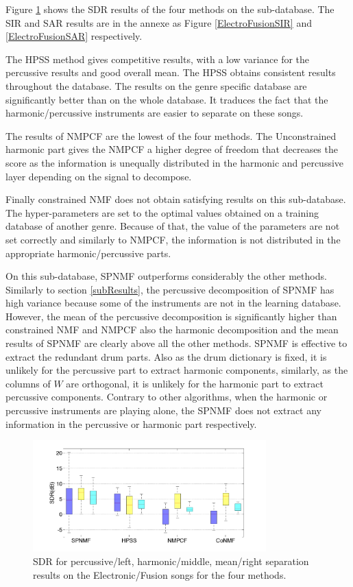 \documentclass[journal]{IEEEtran}
\begin{document}
Figure \ref{ElectroFusionSDR} shows the SDR results of the four methods on the sub-database. The SIR and SAR results are in the annexe as Figure \ref{ElectroFusionSIR} and \ref{ElectroFusionSAR} respectively. 


The HPSS method gives competitive results, with a low variance for the percussive results and good overall mean. The HPSS obtains consistent results throughout the database. The results on the genre specific database are significantly better than on the whole database. It traduces the fact that the harmonic/percussive instruments are easier to separate on these songs. 
 
The results of NMPCF are the lowest of the four methods. The Unconstrained harmonic part gives the NMPCF a higher degree of freedom that decreases the score as the information is unequally distributed in the harmonic and percussive layer depending on the signal to decompose. 

Finally constrained NMF does not obtain satisfying results on this sub-database. The hyper-parameters are set to the optimal values obtained on a training database of another genre. Because of that, the value of the parameters are not set correctly and similarly to NMPCF, the information is not distributed in the appropriate harmonic/percussive parts. 


On this sub-database, SPNMF outperforms considerably the other methods. Similarly to section \ref{subResults}, the percussive decomposition of SPNMF has high variance because some of the instruments are not in the learning database. However, the mean of the percussive decomposition is significantly higher than constrained NMF and NMPCF also the harmonic decomposition and the mean results of SPNMF are clearly above all the other methods. SPNMF is effective to extract the redundant drum parts. Also as the drum dictionary is fixed, it is unlikely for the percussive part to extract harmonic components, similarly, as the columns of $W$ are orthogonal, it is unlikely for the harmonic part to extract percussive components. Contrary to other algorithms, when the harmonic or percussive instruments are playing alone, the SPNMF does not extract any information in the percussive or harmonic part respectively.



\begin{figure}[htb]

  \centering 
  \includegraphics[width=9cm]{fig/ElectroFusionSDR.png}
  \caption{\label{ElectroFusionSDR} SDR for percussive/left, harmonic/middle, mean/right separation results on the Electronic/Fusion songs for the four methods.}
  
\end{figure}
\end{document}
